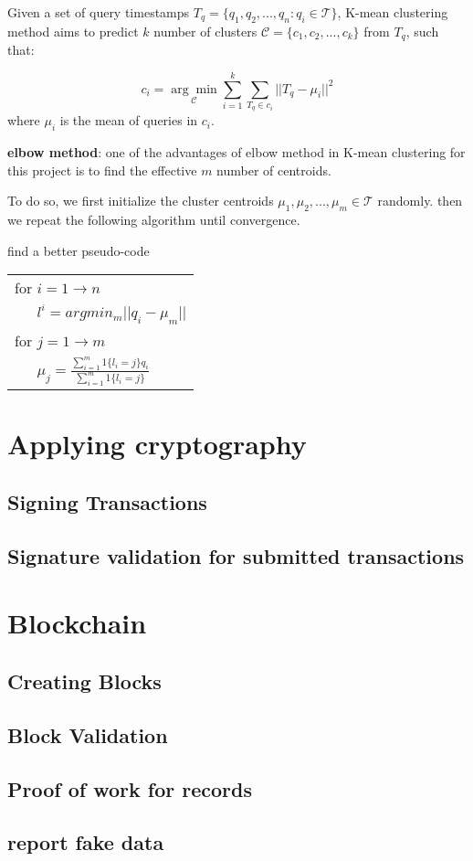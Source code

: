  Given a set of query timestamps $T_q=\{q_1,q_2,...,q_n : q_i \in \mathcal{T}\}$, K-mean clustering method aims to predict $k$ number of clusters $\mathcal{C}=\{c_1,c_2,...,c_k\}$ from $T_q$, such that:
 
 $$c_i = \underset{\mathcal{C}}{\arg\min}\sum_{i=1}^k\sum_{T_q \in c_i} ||T_q-\mu_i||^2$$
where $\mu_i$ is the mean of queries in $c_i$.

\textbf{elbow method}: one of the advantages of elbow method in K-mean clustering for this project is to find the effective $m$ number of centroids. 

To do so, we first initialize the cluster centroids $\mu_1,\mu_2,...,\mu_m \in \mathcal{T}$ randomly.
then we repeat the following algorithm until convergence.

\vspace{1em}
{\small \color{red} find a better pseudo-code
	\begin{tabular}{|l|} \hline
		for $i=1 \to n$ \\
		\verb|   |$l^i= arg min_m||q_i-\mu_m|| $\\
		\verb|| for $j=1 \to m$\\
		\verb|   |$\mu_j=\frac{\sum_{i=1}^m 1\{l_i=j\}q_i}{\sum_{i=1}^m 1\{l_i=j\}}$
		
	\end{tabular}
}
\vspace{1em}

\section{Applying cryptography}
\subsection{Signing Transactions}
\subsection{Signature validation for submitted transactions}
\section{Blockchain}
\subsection{Creating Blocks}
\subsection{Block Validation}
\subsection{Proof of work for records}
\subsection{report fake data}

